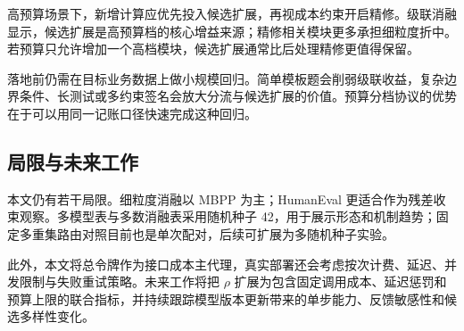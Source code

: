 高预算场景下，新增计算应优先投入候选扩展，再视成本约束开启精修。级联消融显示，候选扩展是高预算档的核心增益来源；精修相关模块更多承担细粒度折中。若预算只允许增加一个高档模块，候选扩展通常比后处理精修更值得保留。

落地前仍需在目标业务数据上做小规模回归。简单模板题会削弱级联收益，复杂边界条件、长测试或多约束签名会放大分流与候选扩展的价值。预算分档协议的优势在于可以用同一记账口径快速完成这种回归。

\subsection{局限与未来工作}

本文仍有若干局限。细粒度消融以 MBPP 为主；HumanEval 更适合作为残差收束观察。多模型表与多数消融表采用随机种子 42，用于展示形态和机制趋势；固定多重集路由对照目前也是单次配对，后续可扩展为多随机种子实验。

此外，本文将总令牌作为接口成本主代理，真实部署还会考虑按次计费、延迟、并发限制与失败重试策略。未来工作将把 $\rho$ 扩展为包含固定调用成本、延迟惩罚和预算上限的联合指标，并持续跟踪模型版本更新带来的单步能力、反馈敏感性和候选多样性变化。
